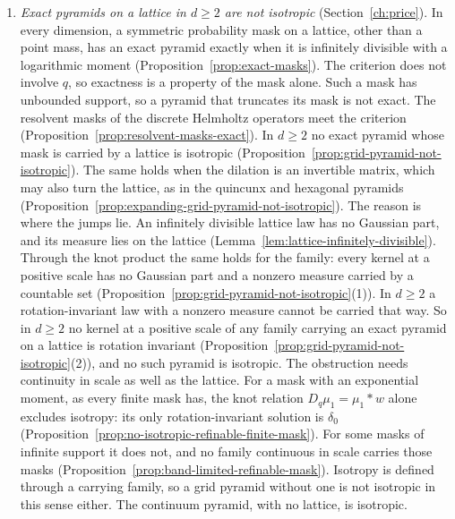\begin{enumerate}
\item \emph{Exact pyramids on a lattice in $d \ge 2$ are not isotropic} (Section~\ref{ch:price}). In every dimension, a
symmetric probability mask on a lattice, other than a point mass, has an exact pyramid exactly when it is
infinitely divisible with a logarithmic moment (Proposition~\ref{prop:exact-masks}). The
criterion does not involve $q$, so exactness is a property of the mask alone. Such a mask has
unbounded support, so a pyramid that truncates its mask is not exact. The resolvent masks of the
discrete Helmholtz operators meet the criterion (Proposition~\ref{prop:resolvent-masks-exact}). In
$d \ge 2$ no exact pyramid whose mask is carried by a lattice is isotropic
(Proposition~\ref{prop:grid-pyramid-not-isotropic}). The same holds when the dilation is an
invertible matrix, which may also turn the lattice, as in the quincunx and hexagonal pyramids
(Proposition~\ref{prop:expanding-grid-pyramid-not-isotropic}). The reason
is where the jumps lie. An infinitely divisible lattice law has no Gaussian part, and its \Levy{}
measure lies on the lattice (Lemma~\ref{lem:lattice-infinitely-divisible}). Through the knot
product the same holds for the family: every kernel at a positive scale has no Gaussian part and a
nonzero \Levy{} measure carried by a countable set
(Proposition~\ref{prop:grid-pyramid-not-isotropic}(1)). In $d \ge 2$ a rotation-invariant law with
a nonzero \Levy{} measure cannot be carried that way. So in $d \ge 2$ no kernel at a positive scale
of any family carrying an exact pyramid on a lattice is rotation invariant
(Proposition~\ref{prop:grid-pyramid-not-isotropic}(2)), and no such pyramid is isotropic. The
obstruction needs continuity in scale as well as the lattice. For a mask with an exponential
moment, as every finite mask has, the knot relation
$D_q\mu_1 = \mu_1 * w$ alone excludes isotropy: its only rotation-invariant solution is $\delta_0$
(Proposition~\ref{prop:no-isotropic-refinable-finite-mask}). For some masks of infinite support it
does not, and no family continuous in scale carries those masks
(Proposition~\ref{prop:band-limited-refinable-mask}).
Isotropy
is defined through a carrying family, so a grid pyramid without one is not isotropic in this sense
either. The continuum \Matern{} pyramid,
with no lattice, is isotropic.


\end{enumerate}
